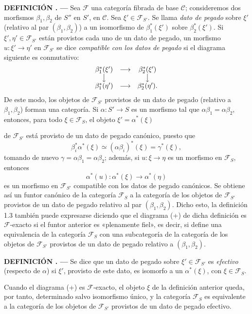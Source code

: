 \documentclass[11pt,twoside,openany]{book}
\numberwithin{equation}{section}
\newcommand{\src}[1]{%
  \phantomsection\hypertarget{src:#1}{}%
  \marginpar{\raggedleft\footnotesize\sffamily #1}%
}
\theoremstyle{plain}
\theoremstyle{definition}
\theoremstyle{remark}
\newcommand{\result}[2]{%
  \par\medskip\noindent\textbf{#1%
  \if\relax\detokenize{#2}\relax\else\space#2\fi. ---}\enspace
}
\newcommand{\FgaUnitKey}{frontmatter}
\renewcommand{\src}[1]{%
  \phantomsection\hypertarget{src:\FgaUnitKey:#1}{}%
  \marginpar{\raggedleft\footnotesize\sffamily #1}%
}
\theoremstyle{plain}
\theoremstyle{definition}
\theoremstyle{remark}
\begin{document}
\result{DEFINICIÓN}{1.4} Sea $\mathcal F$ una categoría fibrada de base
$\mathcal C$; consideremos dos morfismos $\beta_1,\beta_2$ de $S''$ en $S'$,
en $\mathcal C$. Sea
$\xi'\in\mathcal F_{S'}$. Se llama \emph{dato de pegado} sobre $\xi'$
(relativo al par $(\beta_1,\beta_2)$) a un isomorfismo de
$\beta_1^*(\xi')$ sobre $\beta_2^*(\xi')$. Si $\xi',\eta'\in\mathcal F_{S'}$
están provistos cada uno de un dato de pegado, un morfismo
$u:\xi'\longrightarrow\eta'$ en $\mathcal F_{S'}$ se dice
\emph{compatible con los datos de pegado} si el diagrama siguiente es
conmutativo:
\[
\begin{array}{ccc}
  \beta_1^*(\xi') & \longrightarrow & \beta_2^*(\xi') \\
  \big\downarrow && \big\downarrow \\
  \beta_1^*(\eta') & \longrightarrow & \beta_2^*(\eta').
\end{array}
\]
De este modo, los objetos de $\mathcal F_{S'}$ provistos de un dato de pegado
(relativo a $\beta_1,\beta_2$) forman una categoría. Si
$\alpha:S'\longrightarrow S$ es un morfismo tal que
$\alpha\beta_1=\alpha\beta_2$, entonces, para todo $\xi\in\mathcal F_S$, el
objeto $\xi'=\alpha^*(\xi)$

\src{302}
de $\mathcal F_{S'}$ está provisto de un dato de pegado canónico, puesto que
\[
  \beta_i^*\alpha^*(\xi)\simeq(\alpha\beta_i)^*(\xi)=\gamma^*(\xi),
\]
tomando de nuevo $\gamma=\alpha\beta_1=\alpha\beta_2$; además, si
$u:\xi\longrightarrow\eta$ es un morfismo en $\mathcal F_S$, entonces
\[
  \alpha^*(u):\alpha^*(\xi)\longrightarrow\alpha^*(\eta)
\]
es un morfismo en $\mathcal F_{S'}$ compatible con los datos de pegado
canónicos. Se obtiene así un funtor canónico de la categoría $\mathcal F_S$ a
la categoría de los objetos de $\mathcal F_{S'}$ provistos de un dato de pegado
relativo al par $(\beta_1,\beta_2)$. Dicho esto, la definición 1.3 también
puede expresarse diciendo que el diagrama (+) de dicha definición es
$\mathcal F$-exacto si el funtor anterior es «plenamente fiel», es decir, si
define una equivalencia de la categoría $\mathcal F_S$ con una subcategoría de
la categoría de los objetos de $\mathcal F_{S'}$ provistos de un dato de pegado
relativo a $(\beta_1,\beta_2)$.

\result{DEFINICIÓN}{1.5} Se dice que un dato de pegado sobre
$\xi'\in\mathcal F_{S'}$ es \emph{efectivo} (respecto de $\alpha$) si
$\xi'$, provisto de este dato, es isomorfo a un $\alpha^*(\xi)$, con
$\xi\in\mathcal F_S$.

Cuando el diagrama (+) es $\mathcal F$-exacto, el objeto $\xi$ de la definición
anterior queda, por tanto, determinado salvo isomorfismo único, y la categoría
$\mathcal F_S$ es equivalente a la categoría de los objetos de
$\mathcal F_{S'}$ provistos de un dato de pegado efectivo.
\end{document}
